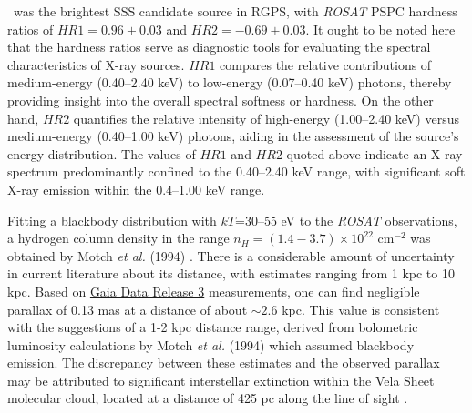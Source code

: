 	\source\ was the brightest SSS candidate source in RGPS, with \textit{ROSAT} PSPC hardness ratios of $HR1=0.96\pm 0.03$ and $HR2=-0.69\pm 0.03$. It ought to be noted here that the hardness ratios serve as diagnostic tools for evaluating the spectral characteristics of X-ray sources. $HR1$ compares the relative contributions of medium-energy (0.40--2.40 keV) to low-energy (0.07--0.40 keV) photons, thereby providing insight into the overall spectral softness or hardness. On the other hand, $HR2$ quantifies the relative intensity of high-energy (1.00--2.40 keV) versus medium-energy (0.40--1.00 keV) photons, aiding in the assessment of the source's energy distribution. The values of $HR1$ and $HR2$ quoted above indicate an X-ray spectrum predominantly confined to the 0.40--2.40 keV range, with significant soft X-ray emission within the 0.4--1.00 keV range. %
	
	Fitting a blackbody distribution with $kT$=30--55 eV to the \textit{ROSAT} observations, a hydrogen column density in the range $n_H=(1.4-3.7)\times 10^{22}$ cm$^{-2}$ was obtained by Motch \textit{et al.} (1994) \cite{motch1994}. There is a considerable amount of uncertainty in current literature about its distance, with estimates ranging from 1 kpc to 10 kpc. Based on %
	\href{https://www.cosmos.esa.int/web/gaia/data-release-3}{Gaia Data Release 3}	measurements, one can find negligible parallax of 0.13 mas at a distance of about $\sim 2.6$ kpc. This value is consistent with the suggestions of a 1-2 kpc distance range, derived from bolometric luminosity calculations by Motch \textit{et al.} (1994) \cite{motch1994} which assumed blackbody emission. The discrepancy between these estimates and the observed parallax may be attributed to significant interstellar extinction within the Vela Sheet molecular cloud, located at a distance of 425 pc along the line of sight \cite{grabelsky1987}. %
	
